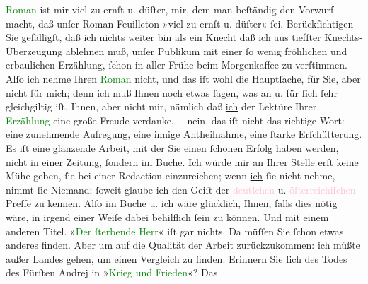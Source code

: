                         \textcolor{green}{Roman}{} ist mir viel zu ernſt u. düſter,
                    mir, dem man beſtändig den Vorwurf macht, daß unſer Roman-Feuilleton »viel zu
                    ernſt u. düſter« ſei. Berückſichtigen Sie gefälligſt, daß ich nichts weiter bin
                    als ein Knecht \label{T_L00186_1v}\label{T_L00186_1h} daß ich aus tiefſter
                    Knechts-Überzeugung ablehnen muß, unſer Publikum mit einer ſo wenig fröhlichen
                    und erbaulichen Erzählung, ſchon in aller Frühe beim Morgenkaffee zu
                    verſtimmen.\pend
           \pstart
           Alſo ich nehme Ihren \textcolor{green}{Roman}{} nicht, und das iſt
                    wohl die Hauptſache, für Sie, aber nicht für mich; denn ich muß Ihnen noch etwas
                    ſagen, was an u. für ſich ſehr gleichgiltig iſt, Ihnen, aber nicht mir, nämlich
                    daß {\pb}\uline{ich} der Lektüre Ihrer \textcolor{green}{Erzählung}{} eine große Freude verdanke, – nein, das iſt
                         nicht das richtige Wort: eine zunehmende Aufregung, eine innige
                    Antheilnahme, eine ſtarke Erſchütterung. Es iſt eine glänzende Arbeit, mit der
                    Sie einen ſchönen Erfolg haben werden, nicht in einer Zeitung, ſondern im Buche.
                    Ich würde mir an Ihrer Stelle erſt keine Mühe geben, ſie bei einer Redaction
                    einzureichen; wenn \uline{ich}{ }ſie nicht nehme, nimmt
                    ſie Niemand; ſoweit glaube ich den Geiſt der \textcolor{pink}{deutſchen}{}\ledrightnote{\textcolor{pink}{Deutschland}} u. \textcolor{pink}{öſterreichiſchen}{}\ledrightnote{\textcolor{pink}{Österreich}} Preſſe zu kennen. Alſo im Buche u. ich wäre
                    glücklich, Ihnen, falls dies nötig wäre, in irgend einer Weiſe dabei behilflich
                    ſein zu können. Und mit einem anderen Titel. »\textcolor{green}{Der
                        ſterbende Herr}{}\ledrightnote{\textcolor{green}{Sterben. Novelle}}« iſt gar nichts. Da müſſen Sie ſchon etwas anderes
                    finden. Aber um auf die Qualität der Arbeit zurückzukommen: ich müßte außer
                    Landes gehen, um einen Vergleich zu finden. Erinnern Sie ſich des Todes des
                    Fürſten Andrej in »\textcolor{green}{Krieg und Frieden}{}\ledrightnote{\textcolor{green}{Krieg und Frieden}}«? Das
